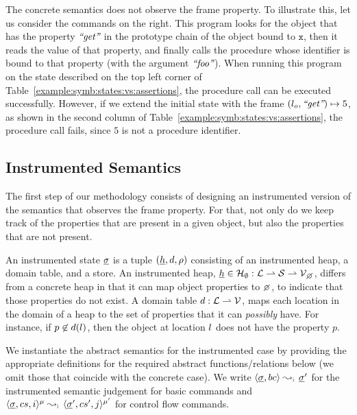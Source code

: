 The \jsil concrete semantics does not observe the frame property. To illustrate this,
let us consider the commands on the right. 
This program looks for the object  that has the property $\text{{\it ``get''}}$ in the 
prototype chain of the object bound to $\mathtt{x}$, then it reads the value of that 
property, and finally calls the procedure whose identifier is bound to that property 
(with the argument $\text{{\it ``foo''}}$). 
When running this program on the state described on the top left corner of 
Table~\ref{example:symb:states:vs:assertions}, the procedure call can be executed 
successfully. However, if we extend the initial state with the frame $(l_o, \text{{\it ``get''}}) \mapsto 5$, 
as shown in the second column of Table~\ref{example:symb:states:vs:assertions}, the procedure 
call fails, since $5$ is not a procedure identifier. 


\subsection{Instrumented Semantics}\label{subsec:instrumented}

The first step of our methodology %
consists of designing an instrumented version of the semantics that observes the frame property. 
%
For that, not only do we keep track of the properties that are present in a given object, but also the properties that 
are not present.

An instrumented state $\underline{\sigma}$ is a tuple $(\underline{h}, d, \rho)$ consisting of an instrumented heap, 
a domain table, and a store. 
%
An instrumented heap, $\iheap \in \iheaps : \locs \partialmap \strings \partialmap \setext{\vals}{\none}$, 
differs from a concrete heap in that it can map object properties to $\none$, to indicate that those properties 
do not exist. 
%
A domain table $d : {\mathcal L} \rightharpoonup \mathcal{V}$, maps each location in the domain of a heap to the set 
of properties that it can \emph{possibly} have. For instance, if $p \not\in d(l)$, then the object 
at location $l$ does not have the property $p$. 
%

We instantiate the abstract semantics for the instrumented case by providing the appropriate definitions 
for the required abstract functions/relations below (we omit those that coincide with the concrete case). 
We write $\absbsemrule{\istate, \bcmd}{\istate'}{\instrumented}$ for the instrumented semantic 
judgement for basic commands and $\abssemrule{\istate, \cs, i}{\istate', \cs', j}{\mode}{\mode'}{\instrumented}$ 
for control flow commands. 

